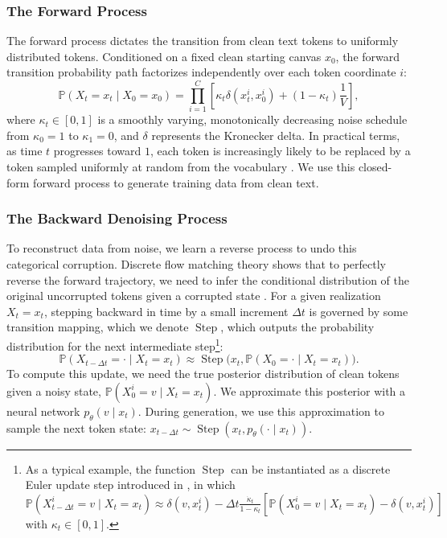 \documentclass[11pt, a4paper, logo, copyright, gdm]{google}
\newcommand{\step}{\operatorname{Step}}
\begin{document}
\subsubsection{The Forward Process}
The forward process dictates the transition from clean text tokens to uniformly distributed tokens. Conditioned on a fixed clean starting canvas $x_0$, the forward transition probability path factorizes independently over each token coordinate $i$:
\begin{equation}\label{eq:factorized_path_pmf}
    \mathbb{P}(X_t=x_t \mid X_0 = x_0) =
    \prod_{i=1}^C \left[ \kappa_t \delta(x_t^i, x_0^i) + (1 - \kappa_t) \frac{1}{V} \right],
\end{equation}
where $\kappa_t \in [0,1]$ is a smoothly varying, monotonically decreasing noise schedule from $\kappa_0 = 1$ to $\kappa_1 = 0$, and $\delta$ represents the Kronecker delta. In practical terms, as time $t$ progresses toward $1$, each token is increasingly likely to be replaced by a token sampled uniformly at random from the vocabulary \citep{hoogeboom2021argmax, austin2021structured}. We use this closed-form forward process to generate training data from clean text.

\subsubsection{The Backward Denoising Process}
To reconstruct data from noise, we learn a reverse process to undo this categorical corruption. Discrete flow matching theory shows that to perfectly reverse the forward trajectory, we need to infer the conditional distribution of the original uncorrupted tokens given a corrupted state \citep{campbell2024generative, gat2024discrete, ou2025absorbing}. For a given realization $X_t = x_t$, stepping backward in time by a small increment $\Delta t$ is governed by some transition mapping, which we denote $\step$, which outputs the probability distribution for the next intermediate step\footnote{As a typical example, the function $\step$ can be instantiated as a discrete Euler update step introduced in \citet{gat2024discrete}, in which $
\mathbb{P}(X_{t-\Delta t}^i = v \mid X_t = x_t) \approx \delta(v, x_t^i) - \Delta t \frac{\dot{\kappa}_t}{1 - \kappa_t} \left[ \mathbb{P}(X_0^i = v \mid X_t = x_t) - \delta(v, x_t^i) \right]$ with $\kappa_t \in [0, 1]$.}:
\begin{equation}\label{eq:transition-mapping}
\mathbb{P}(X_{t-\Delta t} = \cdot \mid X_t = x_t) \approx \operatorname{Step}\Big(x_t, \mathbb{P}(X_{0} = \cdot \mid X_t = x_t)\Big).
\end{equation}
To compute this update, we need the true posterior distribution of clean tokens given a noisy state, $\mathbb{P}(X_{0}^i = v \mid X_t = x_t)$. We approximate this posterior with a neural network $p_\theta(v \mid x_t)$. During generation, we use this approximation to sample the next token state: $x_{t-\Delta t} \sim \operatorname{Step}(x_t, p_\theta(\cdot \mid x_t))$.
\end{document}
